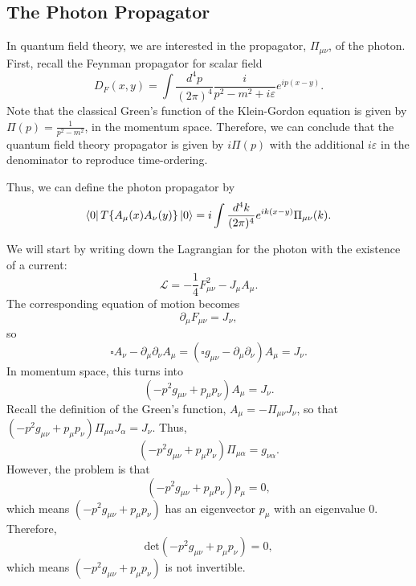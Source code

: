 \documentclass[11pt]{article}
\theoremstyle{definition}
\begin{document}
\subsection{The Photon Propagator}
In quantum field theory, we are interested in the propagator, $\Pi_{\mu\nu}$, of the photon. First, recall the Feynman propagator for scalar field
\begin{equation}
    D_F(x, y) = \int \frac{d^4p}{(2\pi)^4} \frac{i}{p^2-m^2+i\varepsilon}e^{ip(x-y)}.
\end{equation}
Note that the classical Green's function of the Klein-Gordon equation is given by $\Pi(p) = \frac{1}{p^2-m^2}$, in the momentum space. Therefore, we can conclude that the quantum field theory propagator is given by $i\Pi(p)$ with the additional $i\varepsilon$ in the denominator to reproduce time-ordering.

Thus, we can define the photon propagator by
\begin{equation}
    \bra{0}T\{A_\mu(x)A_\nu(y)\}\ket{0} = i\int \frac{d^4k}{(2\pi)^4}e^{ik(x-y)}\Pi_{\mu\nu}(k).
\end{equation}

We will start by writing down the Lagrangian for the photon with the existence of a current:
\begin{equation}
    \mathcal{L} = -\frac{1}{4}F_{\mu\nu}^2 - J_\mu A_\mu.
\end{equation}
The corresponding equation of motion becomes
\begin{equation}
    \partial_\mu F_{\mu\nu} = J_\nu,
\end{equation}
so
\begin{equation}
    \square A_\nu - \partial_\mu \partial_ \nu A_\mu = (\square g_{\mu\nu} - \partial_\mu \partial_ \nu) A_\mu = J_\nu.
\end{equation}
In momentum space, this turns into
\begin{equation}
    (-p^2g_{\mu\nu} +p_\mu p_\nu)A_\mu = J_\nu.
\end{equation}
Recall the definition of the Green's function, $A_\mu = -\Pi_{\mu\nu}J_\nu$, so that $(-p^2g_{\mu\nu} +p_\mu p_\nu)\Pi_{\mu\alpha}J_\alpha = J_\nu$. Thus,
\begin{equation}
    (-p^2g_{\mu\nu} +p_\mu p_\nu)\Pi_{\mu\alpha} = g_{\nu\alpha}.
\end{equation}
However, the problem is that 
\begin{equation}
    (-p^2g_{\mu\nu} +p_\mu p_\nu)p_\mu = 0,
\end{equation}
which means $(-p^2g_{\mu\nu} +p_\mu p_\nu)$ has an eigenvector $p_\mu$ with an eigenvalue $0$. Therefore,
\begin{equation}
    \text{det}(-p^2g_{\mu\nu} +p_\mu p_\nu) = 0,
\end{equation}
which means $(-p^2g_{\mu\nu} +p_\mu p_\nu)$ is not invertible.
\end{document}
